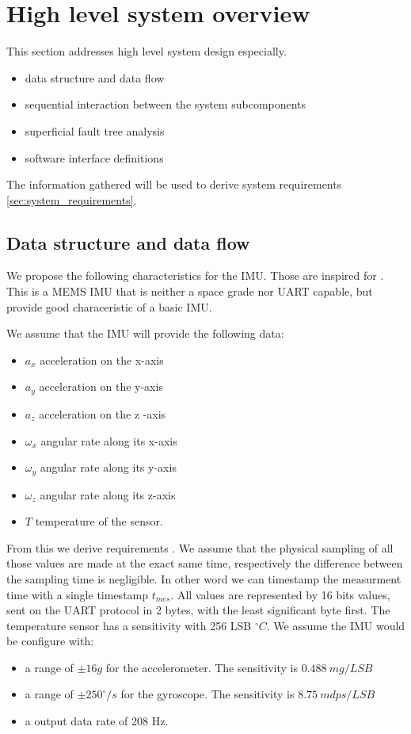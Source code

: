 \section{High level system overview}
This section addresses high level system design especially.
\begin{itemize}
    \item data structure and data flow
    \item sequential interaction between the system subcomponents
    \item superficial fault tree analysis
    \item software interface definitions
\end{itemize}
The information gathered will be used to derive system requirements \ref{sec:system_requirements}.

\subsection{Data structure and data flow}
We propose the following characteristics for the IMU. Those are inspired for \cite{lm6ds3}. This is a MEMS IMU that is neither a space grade nor UART capable, but provide good characeristic of a basic IMU.

We assume that the IMU will provide the following data:
\begin{itemize}
    \item $a_x$ acceleration on the x-axis
    \item $a_y$ acceleration on the y-axis
    \item $a_z$ acceleration on the z -axis
    \item $\omega_x$ angular rate along its x-axis
    \item $\omega_y$ angular rate along its y-axis
    \item $\omega_z$ angular rate along its z-axis
    \item $T$ temperature of the sensor.
\end{itemize}
From this we derive requirements .
We assume that the physical sampling of all those values are made at the exact same time, respectively the difference between the sampling time is negligible.
In other word we can timestamp the measurment time with a single timestamp $t_{mes}$.
All values are represented by 16 bits values, sent on the UART protocol in 2 bytes, with the least significant byte first.
The temperature sensor has a sensitivity with 256 LSB $^{\circ}C$.
We assume the IMU would be configure with:
\begin{itemize}
    \item a range of $\pm 16g$ for the accelerometer. The sensitivity is $0.488~mg/LSB$
    \item a range of $\pm 250^{\circ}/s$ for the gyroscope. The sensitivity is $8.75~mdps/LSB$
    \item a output data rate of 208 Hz.
\end{itemize}

